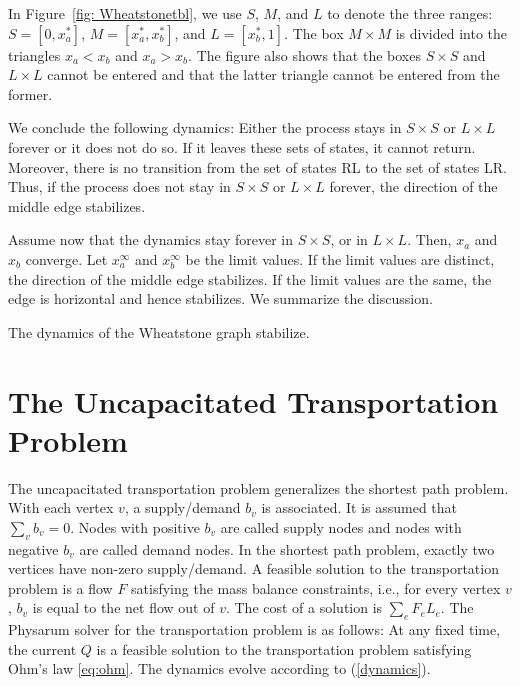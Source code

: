 \documentclass[11pt,a4paper]{article}
\begin{document}
In Figure~\ref{fig: Wheatstonetbl}, we use $S$, $M$, and $L$ to denote the three
ranges: $S = [0,x_a^*]$, $M = [x_a^*,x_b^*]$, and $L = [x_b^*, 1]$. The box $M
\times M$ is divided into the triangles $x_a < x_b$ and $x_a > x_b$. The figure also
shows that the boxes $S \times S$ and $L \times L$ cannot be entered and that
the latter triangle cannot be entered from the former. 

We conclude the following dynamics: Either the process stays in $S \times S$ or
$L \times L$ forever or it does not do so. If it leaves these sets of states,
it cannot return. 
Moreover, there is no transition from the set of states RL to the set of states LR. Thus, if the process does not
stay in $S \times S$ or $L \times L$ forever, the direction of the middle edge
stabilizes. 

Assume now that the dynamics stay forever in $S \times S$, or in $L \times L$. Then, $x_a$ and $x_b$
converge. Let $x_a^\infty$ and $x_b^\infty$ be the limit values. If the limit
values are distinct, the direction of the middle edge stabilizes. If the limit
values are the same, the edge is horizontal and hence stabilizes. We summarize
the discussion. 

\begin{theorem}\label{thm: Wheatstone} The dynamics of the Wheatstone graph stabilize.\end{theorem}







\section{The Uncapacitated Transportation Problem} 
\label{sec:transportation}

The uncapacitated transportation problem generalizes the shortest path
problem. With each vertex $v$, a
supply/demand $b_v$ is associated. It is assumed that $\sum_v b_v = 0$. Nodes
with positive $b_v$ are called supply nodes and nodes with negative $b_v$ are
called demand nodes. In the shortest path problem, exactly two vertices have
non-zero supply/demand. A feasible solution to the transportation problem is a
flow $F$ satisfying the mass balance constraints, i.e., for every vertex $v$,
$b_v$ is equal to the net flow out of $v$. The cost of a solution is $\sum_e F_e
L_e$. The Physarum solver for the transportation problem is as follows: At any
fixed time, the current $Q$ is a feasible solution to the
transportation problem satisfying Ohm's law \eqref{eq:ohm}. The
dynamics evolve according to (\ref{dynamics}). 
\end{document}
